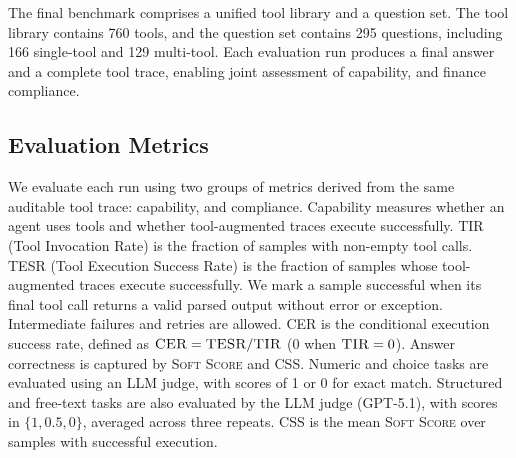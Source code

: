 \documentclass[sigconf,nonacm]{acmart}
\newcommand{\tir}{\textsc{TIR}\xspace}
\newcommand{\tesr}{\textsc{TESR}\xspace}
\newcommand{\cer}{\textsc{CER}\xspace}
\newcommand{\soft}{\textsc{Soft Score}\xspace}
\newcommand{\css}{\textsc{CSS}\xspace}
\newcommand{\tmr}{\textsc{TMR}\xspace}
\newcommand{\imr}{\textsc{IMR}\xspace}
\newcommand{\dmr}{\textsc{DMR}\xspace}
\begin{document}
The final benchmark comprises a unified tool library and a question set.
The tool library contains 760 tools, and the question set contains 295 questions, including 166 single-tool and 129 multi-tool.
Each evaluation run produces a final answer and a complete tool trace, enabling joint assessment of capability, and finance compliance.

\subsection{Evaluation Metrics}
\label{subsec:bench_metrics}

We evaluate each run using two groups of metrics derived from the same auditable tool trace: capability, and compliance.
Capability measures whether an agent uses tools and whether tool-augmented traces execute successfully.
\tir{} (Tool Invocation Rate) is the fraction of samples with non-empty tool calls.
\tesr{} (Tool Execution Success Rate) is the fraction of samples whose tool-augmented traces execute successfully.
We mark a sample successful when its final tool call returns a valid parsed output without error or exception. Intermediate failures and retries are allowed.
\cer{} is the conditional execution success rate, defined as $\cer=\tesr/\tir$ (0 when $\tir=0$).
Answer correctness is captured by \soft{} and \css{}.
Numeric and choice tasks are evaluated using an LLM judge, with scores of 1 or 0 for exact match. Structured and free-text tasks are also evaluated by the LLM judge (GPT-5.1), with scores in $\{1, 0.5, 0\}$, averaged across three repeats.
\css{} is the mean \soft{} over samples with successful execution.

\end{document}
